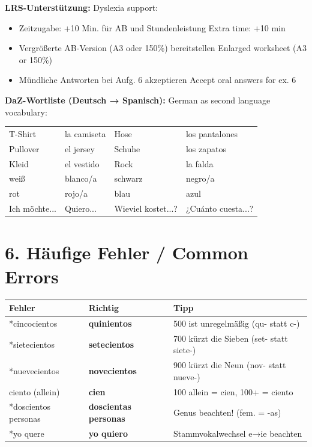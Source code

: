 \documentclass[11pt, a4paper]{article}
\newcommand{\fachfarbe}{spanisch}
\newcommand{\es}[1]{\textcolor{\fachfarbe}{\textbf{#1}}}
\newcommand{\en}[1]{{\scriptsize\textcolor{grau}{#1}}}
\begin{document}
\textbf{LRS-Unterstützung:} \en{Dyslexia support:}
\begin{itemize}[nosep]
    \item Zeitzugabe: +10 Min. für AB und Stundenleistung \en{Extra time: +10 min}
    \item Vergrößerte AB-Version (A3 oder 150\%) bereitstellen \en{Enlarged worksheet (A3 or 150\%)}
    \item Mündliche Antworten bei Aufg. 6 akzeptieren \en{Accept oral answers for ex. 6}
\end{itemize}

\vspace{0.5em}

\textbf{DaZ-Wortliste (Deutsch → Spanisch):} \en{German as second language vocabulary:}

\begin{tabular}{ll@{\hspace{2cm}}ll}
T-Shirt & la camiseta & Hose & los pantalones \\
Pullover & el jersey & Schuhe & los zapatos \\
Kleid & el vestido & Rock & la falda \\
weiß & blanco/a & schwarz & negro/a \\
rot & rojo/a & blau & azul \\
Ich möchte... & Quiero... & Wieviel kostet...? & ¿Cuánto cuesta...? \\
\end{tabular}

\vspace{1em}


\section*{6. Häufige Fehler / Common Errors}

\begin{fehlerbox}
\begin{tabularx}{\textwidth}{|l|l|X|}
\hline
\textbf{Fehler} & \textbf{Richtig} & \textbf{Tipp} \\
\hline
*cincocientos & \es{quinientos} & 500 ist unregelmäßig (qu- statt c-) \\
\hline
*sietecientos & \es{setecientos} & 700 kürzt die Sieben (set- statt siete-) \\
\hline
*nuevecientos & \es{novecientos} & 900 kürzt die Neun (nov- statt nueve-) \\
\hline
ciento (allein) & \es{cien} & 100 allein = cien, 100+ = ciento \\
\hline
*doscientos personas & \es{doscientas personas} & Genus beachten! (fem. = -as) \\
\hline
*yo quere & \es{yo quiero} & Stammvokalwechsel e→ie beachten \\
\hline
\end{tabularx}
\end{fehlerbox}
\end{document}
